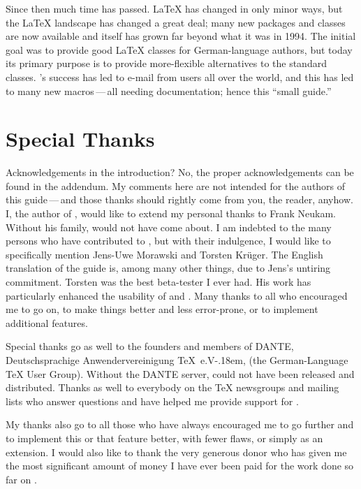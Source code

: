 Since then much time has passed. {\LaTeX} has changed in only minor ways, but
the {\LaTeX} landscape has changed a great deal; many new packages and classes
are now available and {\KOMAScript} itself has grown far beyond what it was in
1994. The initial goal was to provide good {\LaTeX} classes for
German-language authors, but today its primary purpose is to provide
more-flexible alternatives to the standard classes. {\KOMAScript}'s success
has led to e-mail from users all over the world, and this has led to many new
macros\,---\,all needing documentation; hence this ``small guide.''


\section{Special Thanks}

Acknowledgements in the introduction? No, the proper acknowledgements can be
found in the addendum. My comments here are not intended for the authors of
this guide\,---\,and those thanks should rightly come from you, the reader,
anyhow. I, the author of {\KOMAScript}, would like to extend my personal
thanks to Frank Neukam.  Without his {\Script} family, {\KOMAScript} would not
have come about.  I am indebted to the many persons who have contributed to
{\KOMAScript}, but with their indulgence, I would like to specifically mention
Jens-Uwe Morawski and Torsten Kr\"uger. The English translation of the guide
is, among many other things, due to Jens's untiring commitment. Torsten was
the best beta-tester I ever had. His work has particularly enhanced the
usability of  and . Many thanks to all who
encouraged me to go on, to make things better and less error-prone, or to
implement additional features.

Special thanks go as well to the founders and members of DANTE,
Deutschsprachige Anwendervereinigung {\TeX}~e.V\kern-.18em, (the
German-Language {\TeX} User Group). Without the DANTE server, {\KOMAScript}
could not have been released and distributed. Thanks as well to everybody on
the {\TeX} newsgroups and mailing lists who answer questions and have helped
me provide support for {\KOMAScript}.

My thanks also go to all those who have always encouraged me to go further and
to implement this or that feature better, with fewer flaws, or simply as an
extension. I would also like to thank the very generous donor who has given me
the most significant amount of money I have ever been paid for the work done
so far on \KOMAScript{}.

